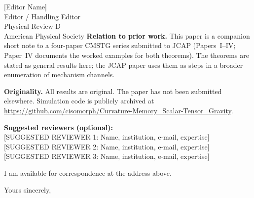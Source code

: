 \documentclass[12pt,a4paper]{letter}
\begin{document}
\begin{letter}{[Editor Name]\\
               Editor / Handling Editor\\
               Physical Review D\\
               American Physical Society}
\textbf{Relation to prior work.}
This paper is a companion short note to a four-paper CMSTG series submitted
to JCAP (Papers~I--IV; Paper~IV documents the worked examples for both
theorems).  The theorems are stated as general results here; the
JCAP paper uses them as steps in a broader enumeration of mechanism channels.

\textbf{Originality.}
All results are original.  The paper has not been submitted elsewhere.
Simulation code is publicly archived at
\url{https://github.com/cisomorph/Curvature-Memory_Scalar-Tensor_Gravity}.

\textbf{Suggested reviewers (optional):}\\
{[SUGGESTED REVIEWER 1: Name, institution, e-mail, expertise]}\\
{[SUGGESTED REVIEWER 2: Name, institution, e-mail, expertise]}\\
{[SUGGESTED REVIEWER 3: Name, institution, e-mail, expertise]}

I am available for correspondence at the address above.

\closing{Yours sincerely,}

\end{letter}
\end{document}
